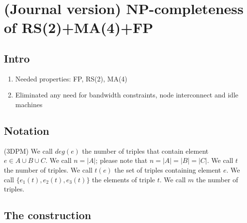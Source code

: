 \section{(Journal version) NP-completeness of RS(2)+MA(4)+FP}

\subsection{Intro}

\begin{enumerate}
  \item Needed properties: FP, RS(2), MA(4)
  \item Eliminated any need for bandwidth constraints, node interconnect and idle machines
\end{enumerate}

\subsection{Notation}

(3DPM) We call $deg(e)$ the number of triples that contain element
$e\in A\cup B\cup C$. We call $n=|A|$; please note that
$n=|A|=|B|=|C|$. We call $t$ the number of triples. We call $t(e)$ the
set of triples containing element $e$. We call
$\lbrace e_1(t), e_2(t), e_3(t) \rbrace$ the elements of triple $t$. We call $m$ the number of triples.

\subsection{The construction}

